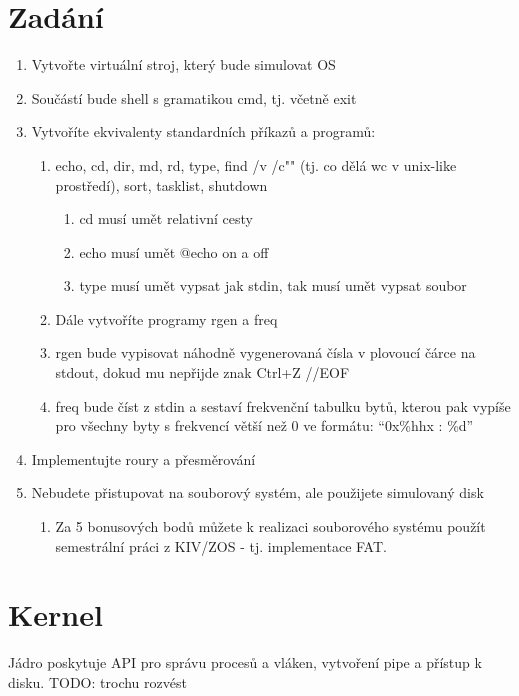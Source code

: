 \documentclass[11pt,a4paper]{scrartcl}
\begin{document}
	\section{Zadání}
	\begin{enumerate}
		\item 	Vytvořte virtuální stroj, který bude simulovat OS
		\item 	Součástí bude shell s gramatikou cmd, tj. včetně exit
		\item 	Vytvoříte ekvivalenty standardních příkazů a programů:
		\begin{enumerate}
			\item echo, cd, dir, md, rd, type, find /v /c"" (tj. co dělá wc v unix-like prostředí), sort, tasklist, shutdown
			
			\begin{enumerate}
				\item	cd musí umět relativní cesty
				\item	echo musí umět @echo on a off
				\item	type musí umět vypsat jak stdin, tak musí umět vypsat soubor
			\end{enumerate}
		
			\item	Dále vytvoříte programy rgen a freq
			\item	rgen bude vypisovat náhodně vygenerovaná čísla v plovoucí čárce na stdout, dokud mu nepřijde znak Ctrl+Z //EOF
			\item	freq bude číst z stdin a sestaví frekvenční tabulku bytů, kterou pak vypíše pro všechny byty s frekvencí větší než 0 ve formátu: “0x\%hhx : \%d”
		\end{enumerate}
		\item 	Implementujte roury a přesměrování
		\item 	Nebudete přistupovat na souborový systém, ale použijete simulovaný disk
		
		\begin{enumerate}
			\item 	Za 5 bonusových bodů můžete k realizaci souborového systému použít semestrální práci z KIV/ZOS - tj. implementace FAT.
		\end{enumerate}
	\end{enumerate}

	\section{Kernel}
	Jádro poskytuje API pro správu procesů a vláken, vytvoření pipe a přístup k disku. TODO: trochu rozvést
	
\end{document}
